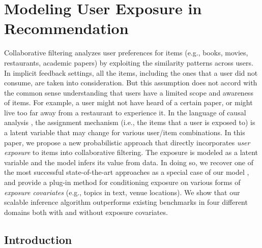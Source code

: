 

\chapter{Modeling User Exposure in Recommendation} \label{chpt:expomf}



\newcommand{\mypar}[1]{\vspace{0.1in}\noindent \textbf{#1 \,}}



Collaborative filtering analyzes user preferences for items (e.g., books,
movies, restaurants, academic papers) by exploiting the similarity patterns
across users. In implicit feedback settings, all the items, including the ones 
that a user did not consume, are taken into consideration. But this
assumption does not accord with the common sense understanding that users have
a limited scope and awareness of items. For example, a user might not have
heard of a certain paper, or might live too far away from a restaurant to
experience it. In the language of causal analysis \cite{imbens2015causal}, the
assignment mechanism (i.e., the items that a user is exposed to) is a latent
variable that may change for various user/item combinations. 
In this paper, we propose a new probabilistic approach that directly
incorporates \emph{user exposure} to items into collaborative filtering.
The exposure is modeled as a latent variable and the model infers its
value from data. In doing so, we recover one of the most successful
state-of-the-art approaches as a special case of our model
\cite{hu2008collaborative}, and provide a plug-in method for conditioning
exposure on various forms of \emph{exposure covariates} (e.g., topics in text,
venue locations). We show that our scalable inference algorithm
outperforms existing benchmarks in four different domains both with and
without exposure covariates.





\section{Introduction}
\label{sec:introduction}

